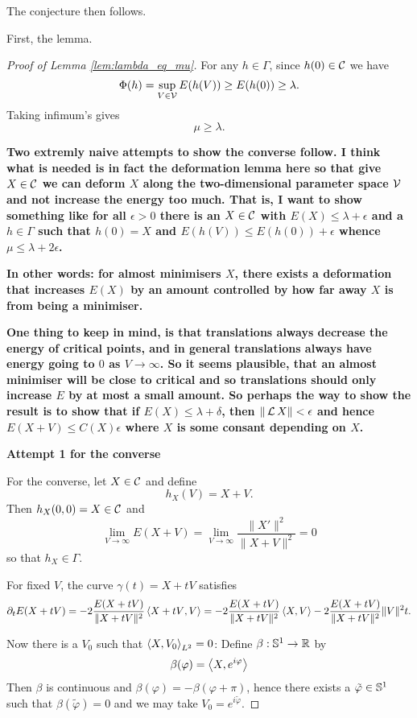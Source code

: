 \documentclass[12pt]{article}
\begin{document}
The conjecture then follows.

First, the lemma.

\begin{proof}[Proof of Lemma \ref{lem:lambda_eq_mu}]
For any \(h \in \Gamma\), since \(h(0) \in \operatorname{\mathcal{C}}\) we have
\[
\Phi(h) = \sup_{V \in \operatorname{\mathcal{V}}} E(h(V)) \geq E(h(0)) \geq \lambda.
\]
Taking infimum's gives
\[
\mu \geq \lambda.
\]

\textbf{Two extremly naive attempts to show the converse follow. I think what is needed is in fact the deformation lemma here so that give \(X \in \operatorname{\mathcal{C}}\) we can deform \(X\) along the two-dimensional parameter space \(\operatorname{\mathcal{V}}\) and not increase the energy too much. That is, I want to show something like for all \(\epsilon > 0\) there is an \(X \in \operatorname{\mathcal{C}}\) with \(E(X) \leq \lambda + \epsilon\) and a \(h \in \Gamma\) such that \(h(0) = X\) and \(E(h(V)) \leq E(h(0)) + \epsilon\) whence \(\mu \leq \lambda + 2\epsilon\).}

\textbf{In other words: for almost minimisers \(X\), there exists a deformation that increases \(E(X)\) by an amount controlled by how far away \(X\) is from being a minimiser.}

\textbf{One thing to keep in mind, is that translations always decrease the energy of critical points, and in general translations always have energy going to \(0\) as \(V \to \infty\). So it seems plausible, that an almost minimiser will be close to critical and so translations should only increase \(E\) by at most a small amount. So perhaps the way to show the result is to show that if \(E(X) \leq \lambda + \delta\), then \(\|\operatorname{\mathcal{L}} X\| < \epsilon\) and hence \(E(X + V) \leq C(X) \epsilon\) where \(X\) is some consant depending on \(X\).}

\textbf{Attempt 1 for the converse}

For the converse, let \(X \in \operatorname{\mathcal{C}}\) and define
\[
h_X(V) = X + V.
\]
Then \(h_X(0, 0) = X \in \operatorname{\mathcal{C}}\) and
\[
\lim_{V \to \infty} E(X + V) = \lim_{V \to \infty} \frac{\|X'\|^2}{\|X + V\|^2} = 0
\]
so that \(h_X \in \Gamma\).

For fixed \(V\), the curve \(\gamma(t) = X + tV\) satisfies
\[
\partial_t E(X + tV) = -2\frac{E(X+tV)}{\|X+tV\|^2} \left\langle{X+tV},{V}\right\rangle = -2\frac{E(X+tV)}{\|X+tV\|^2} \left\langle{X},{V}\right\rangle -2\frac{E(X+tV)}{\|X+tV\|^2} \|V\|^2 t.
\]

Now there is a \(V_0\) such that \(\left\langle{X},{V_0}\right\rangle_{L^2} = 0\): Define \(\beta: \operatorname{\mathbb{S}^1} \to \operatorname{\mathbb{R}}\) by
\[
\beta(\varphi) = \left\langle{X},{e^{i\varphi}}\right\rangle
\]
Then \(\beta\) is continuous and \(\beta(\varphi) = -\beta(\varphi+\pi)\), hence  there exists a \(\tilde{\varphi} \in \operatorname{\mathbb{S}^1}\) such that \(\beta(\tilde{\varphi}) = 0\) and we may take \(V_0 = e^{i\tilde{\varphi}}\).   


\end{proof}
\end{document}
